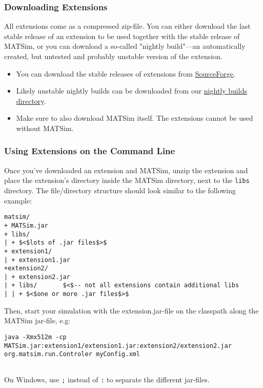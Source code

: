 \documentclass[a4paper,11pt]{report}
\begin{document}
\subsubsection{Downloading Extensions}

All extensions come as a compressed zip-file. You can either download  the last stable release of an extension to be used together with the  stable release of MATSim, or you can download a so-called "nightly  build"—an automatically created, but untested and probably unstable  version of the extension.
\begin{itemize}
	\item You can download the stable releases of extensions from \href{http://sourceforge.net/projects/matsim/files/MATSim/}{SourceForge}.
	\item Likely unstable nightly builds can be downloaded from our \href{http://matsim.org/files/builds/}{nightly builds directory}.
	\item Make sure to also download MATSim itself. The extensions cannot be used without MATSim.
\end{itemize}

\subsubsection{Using Extensions on the Command Line}

Once you've downloaded an extension and MATSim, unzip the extension  and place the extension's directory inside the MATSim directory, next to  the 
\texttt{libs} directory. The file/directory structure should look similar to the following example:
\begin{verbatim}
matsim/
+ MATSim.jar
+ libs/
| + $<$lots of .jar files$>$
+ extension1/
| + extension1.jar
+extension2/
| + extension2.jar
| + libs/       $<$-- not all extensions contain additional libs
| | + $<$one or more .jar files$>$
\end{verbatim}

Then, start your simulation with the extension.jar-file on the classpath along the MATSim jar-file, e.g:
\begin{verbatim}
java -Xmx512m -cp MATSim.jar:extension1/extension1.jar:extension2/extension2.jar org.matsim.run.Controler myConfig.xml


\end{verbatim}

On Windows, use 
\texttt{;} instead of 
\texttt{:} to separate the different jar-files.
\end{document}
